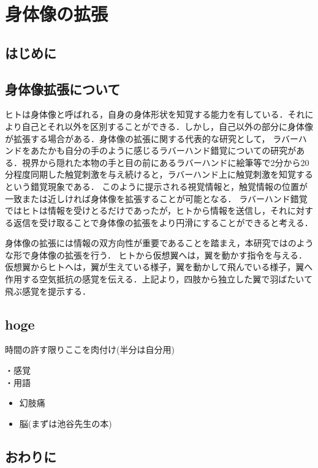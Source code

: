\chapter[身体像の拡張]%
        {身体像の拡張}

\section{はじめに}


\section{身体像拡張について}
    ヒトは身体像と呼ばれる，自身の身体形状を知覚する能力を有している．それにより自己とそれ以外を区別することができる．しかし，自己以外の部分に身体像が拡張する場合がある．身体像の拡張に関する代表的な研究として，
    ラバーハンドをあたかも自分の手のように感じるラバーハンド錯覚についての研究がある\cite{botvinick1998rubber}．視界から隠れた本物の手と目の前にあるラバーハンドに絵筆等で2分から20分程度同期した触覚刺激を与え続けると，ラバーハンド上に触覚刺激を知覚するという錯覚現象である．
    このように提示される視覚情報と，触覚情報の位置が一致または近しければ身体像を拡張することが可能となる．
    ラバーハンド錯覚ではヒトは情報を受けとるだけであったが，ヒトから情報を送信し，それに対する返信を受け取ることで身体像の拡張をより円滑にすることができると考える．

    身体像の拡張には情報の双方向性が重要であることを踏まえ，本研究ではのような形で身体像の拡張を行う．
    ヒトから仮想翼へは，翼を動かす指令を与える．仮想翼からヒトへは，翼が生えている様子，翼を動かして飛んでいる様子，翼へ作用する空気抵抗の感覚を伝える．上記より，四肢から独立した翼で羽ばたいて飛ぶ感覚を提示する．\\


\section{hoge}
時間の許す限りここを肉付け(半分は自分用)

・感覚\\
・用語\\



\begin{itemize}
\item 幻肢痛
\item 脳(まずは池谷先生の本)
\end{itemize}

\section{おわりに}